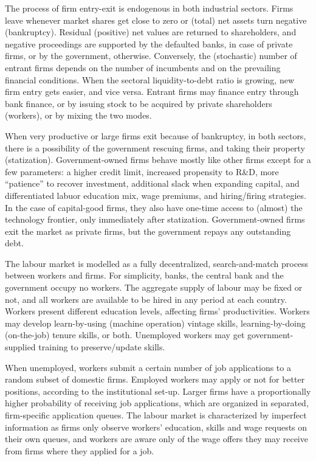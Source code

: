 \documentclass[a4paper,11pt]{article}
\begin{document}
The process of firm entry-exit is endogenous in both industrial sectors. Firms leave whenever market shares get close to zero or (total) net assets turn negative (bankruptcy). Residual (positive) net values are returned to shareholders, and negative proceedings are supported by the defaulted banks, in case of private firms, or by the government, otherwise. Conversely, the (stochastic) number of entrant firms depends on the number of incumbents and on the prevailing financial conditions. When the sectoral liquidity-to-debt ratio is growing, new firm entry gets easier, and vice versa. Entrant firms may finance entry through bank finance, or by issuing stock to be acquired by private shareholders (workers), or by mixing the two modes.

When very productive or large firms exit because of bankruptcy, in both sectors, there is a possibility of the government rescuing firms, and taking their property (statization). Government-owned firms behave mostly like other firms except for a few parameters: a higher credit limit, increased propensity to R\&D, more ``patience'' to recover investment, additional slack when expanding capital, and differentiated labuor education mix, wage premiums, and hiring/firing strategies. In the case of capital-good firms, they also have one-time access to (almost) the technology frontier, only immediately after statization. Government-owned firms exit the market as private firms, but the government repays any outstanding debt.

The labour market is modelled as a fully decentralized, search-and-match process between workers and firms. For simplicity, banks, the central bank and the government occupy no workers. The aggregate supply of labour may be fixed or not, and all workers are available to be hired in any period at each country. Workers present different education levels, affecting firms' productivities. Workers may develop learn-by-using (machine operation) vintage skills, learning-by-doing (on-the-job) tenure skills, or both. Unemployed workers may get government-supplied training to preserve/update skills.

When unemployed, workers submit a certain number of job applications to a random subset of domestic firms. Employed workers may apply or not for better positions, according to the institutional set-up. Larger firms have a proportionally higher probability of receiving job applications, which are organized in separated, firm-specific application queues. The labour market is characterized by imperfect information as firms only observe workers' education, skills and wage requests on their own queues, and workers are aware only of the wage offers they may receive from firms where they applied for a job.
\end{document}
